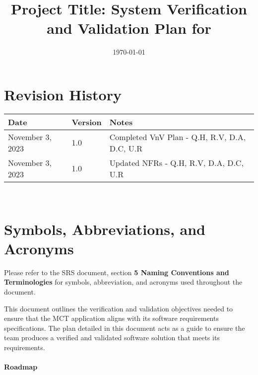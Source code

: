\documentclass[12pt, titlepage]{article}
\begin{document}
\title{Project Title: System Verification and Validation Plan for \progname{}} 
\author{\authname}
\date{\today}
	
\maketitle


\section*{Revision History}

\begin{tabularx}{\textwidth}{p{3cm}p{2cm}X}
\toprule {\bf Date} & {\bf Version} & {\bf Notes}\\
\midrule
November 3, 2023 & 1.0 & Completed VnV Plan - Q.H, R.V, D.A, D.C, U.R\\

November 3, 2023 & 1.0 & Updated NFRs - Q.H, R.V, D.A, D.C, U.R\\

\bottomrule
\end{tabularx}

~\\

\newpage

\tableofcontents

\newpage

\section{Symbols, Abbreviations, and Acronyms}

Please refer to the SRS document, section \textbf{5 Naming Conventions and Terminologies} for symbols, abbreviation, and acronyms used throughout the document.

\newpage



This document outlines the verification and validation objectives needed to ensure that the MCT application aligns with its software requirements specifications. The plan detailed in this document acts as a guide to ensure the team produces a verified and validated software solution that meets its requirements. 
\\\\
\textbf{Roadmap}
\end{document}
